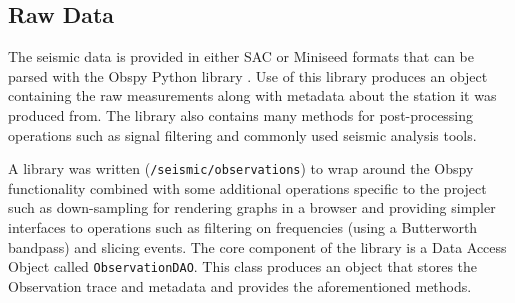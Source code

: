 \documentclass[../report.tex]{subfiles}
\begin{document}
\subsection{Raw Data}
	The seismic data is provided in either SAC or Miniseed formats that can be parsed with the Obspy Python library \citep{obspy}.  Use of this library produces an object containing the raw measurements along with metadata about the station it was produced from.  The library also contains many methods for post-processing operations such as signal filtering and commonly used seismic analysis tools.
	
	A library was written (\texttt{/seismic/observations}) to wrap around the Obspy functionality combined with some additional operations specific to the project such as down-sampling for rendering graphs in a browser and providing simpler interfaces to operations such as filtering on frequencies (using a Butterworth bandpass) and slicing events.  The core component of the library is a Data Access Object called \texttt{ObservationDAO}.  This class produces an object that stores the Observation trace and metadata and provides the aforementioned methods.
\end{document}
